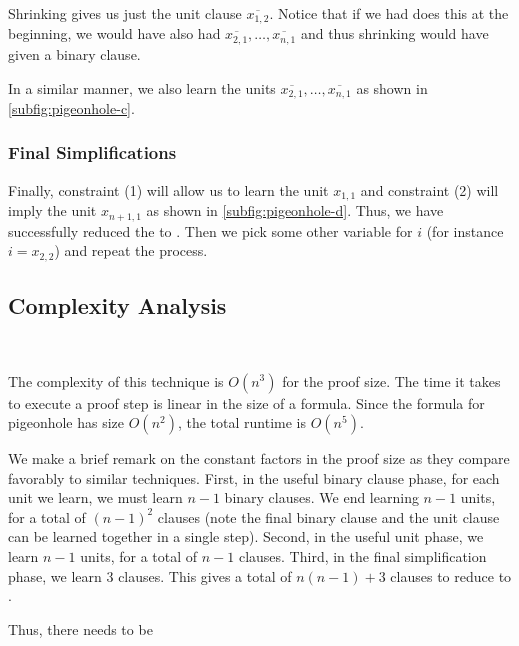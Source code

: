 Shrinking gives us just the unit clause $\overline{x_{1, 2}}$. Notice that if we had does this at the beginning, we would have also had $\overline{x_{2, 1}}, \ldots, \overline{x_{n, 1}}$ and thus shrinking would have given a binary clause.

In a similar manner, we also learn the units $\overline{x_{2, 1}}, \ldots, \overline{x_{n, 1}}$ as shown in \autoref{subfig:pigeonhole-c}.

\subsubsection{Final Simplifications} Finally, constraint (1) will allow us to learn the unit $x_{1, 1}$ and constraint (2) will imply the unit $x_{n+1, 1}$ as shown in \autoref{subfig:pigeonhole-d}. Thus, we have successfully reduced the  to . Then we pick some other variable for $i$ (for instance $i = x_{2, 2}$) and repeat the process.

\subsection{Complexity Analysis}~\label{subsec:complexity analysis}

The complexity of this technique is $O(n^3)$ for the proof size. The time it takes to execute a proof step is linear in the size of a formula. Since the formula for pigeonhole has size $O(n^2)$, the total runtime is $O(n^5)$.

We make a brief remark on the constant factors in the proof size as they compare favorably to similar techniques. First, in the useful binary clause phase, for each unit we learn, we must learn $n-1$ binary clauses. We end learning $n-1$ units, for a total of $(n-1)^2$ clauses (note the final binary clause and the unit clause can be learned together in a single step). Second, in the useful unit phase, we learn $n-1$ units, for a total of $n-1$ clauses. Third, in the final simplification phase, we learn 3 clauses. This gives a total of $n(n-1) + 3$ clauses to reduce  to .

Thus, there needs to be 